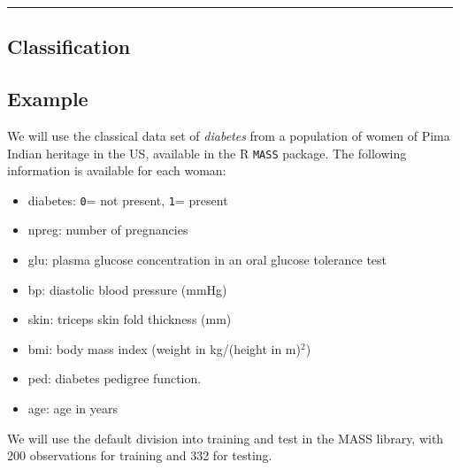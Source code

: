 \documentclass[
  letterpaper,
  DIV=11,
  numbers=noendperiod]{scrartcl}
\newenvironment{Shaded}{\begin{snugshade}}{\end{snugshade}}
\newcommand{\DecValTok}[1]{\textcolor[rgb]{0.68,0.00,0.00}{#1}}
\newcommand{\FunctionTok}[1]{\textcolor[rgb]{0.28,0.35,0.67}{#1}}
\newcommand{\NormalTok}[1]{\textcolor[rgb]{0.00,0.23,0.31}{#1}}
\newcommand{\OtherTok}[1]{\textcolor[rgb]{0.00,0.23,0.31}{#1}}
\newcommand{\SpecialCharTok}[1]{\textcolor[rgb]{0.37,0.37,0.37}{#1}}
\providecommand{\tightlist}{%
  \setlength{\itemsep}{0pt}\setlength{\parskip}{0pt}}\usepackage{longtable,booktabs,array}
\begin{document}
\begin{center}\rule{0.5\linewidth}{0.5pt}\end{center}

\hypertarget{classification-1}{%
\subsection{Classification}\label{classification-1}}

\hypertarget{example}{%
\subsection{Example}\label{example}}

We will use the classical data set of \emph{diabetes} from a population
of women of Pima Indian heritage in the US, available in the R
\texttt{MASS} package. The following information is available for each
woman:

\begin{itemize}
\tightlist
\item
  diabetes: \texttt{0}= not present, \texttt{1}= present
\item
  npreg: number of pregnancies
\item
  glu: plasma glucose concentration in an oral glucose tolerance test
\item
  bp: diastolic blood pressure (mmHg)
\item
  skin: triceps skin fold thickness (mm)
\item
  bmi: body mass index (weight in kg/(height in m)\(^2\))
\item
  ped: diabetes pedigree function.
\item
  age: age in years
\end{itemize}

We will use the default division into training and test in the MASS
library, with 200 observations for training and 332 for testing.

\begin{Shaded}
\end{Shaded}
\end{document}
